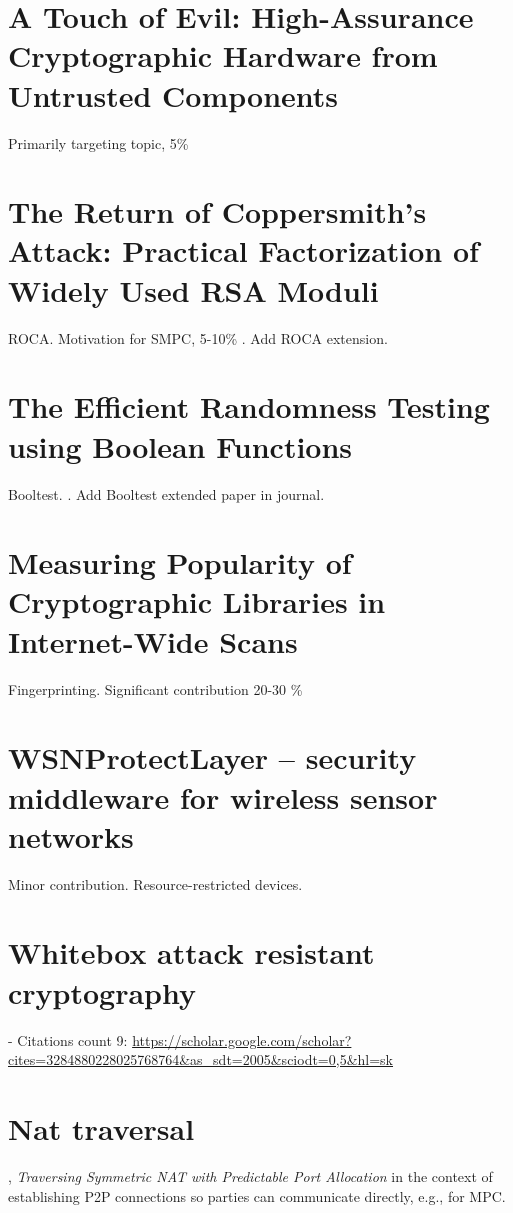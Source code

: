 \documentclass[
  digital, %
  twoside, %
  table,   %
  lof,     %
  lot,     %
]{fithesis3}
\theoremstyle{definition}
\theoremstyle{remark}
\begin{document}
\section{A Touch of Evil: High-Assurance Cryptographic Hardware from Untrusted Components}
Primarily targeting topic, 5\% \cite{2017-ccs-mavroudis}

\section{The Return of Coppersmith's Attack: Practical Factorization of Widely Used RSA Moduli}
ROCA. Motivation for SMPC, 5-10\% \cite{2017-ccs-nemec}.
Add ROCA extension.

\section{The Efficient Randomness Testing using Boolean Functions}
Booltest. \cite{booltest_secrypt2017}.
Add Booltest extended paper in journal.

\section{Measuring Popularity of Cryptographic Libraries in Internet-Wide Scans}
Fingerprinting. Significant contribution 20-30 \% \cite{2017-acsac-nemec}

\section{WSNProtectLayer – security middleware for wireless sensor networks}
Minor contribution. Resource-restricted devices. \cite{wsnprotectlayer}

\section{Whitebox attack resistant cryptography}
\cite{whitebox_klinec_santacrypt2013, Klinec2013thesis} 

- Citations count 9: \url{https://scholar.google.com/scholar?cites=3284880228025768764&as_sdt=2005&sciodt=0,5&hl=sk}

\section{Nat traversal}
\cite{Klinec:2014:TSN:2659651.2659698},
\emph{Traversing Symmetric NAT with Predictable Port Allocation} in the context of establishing P2P connections so parties can communicate directly, e.g., for MPC.
\end{document}
